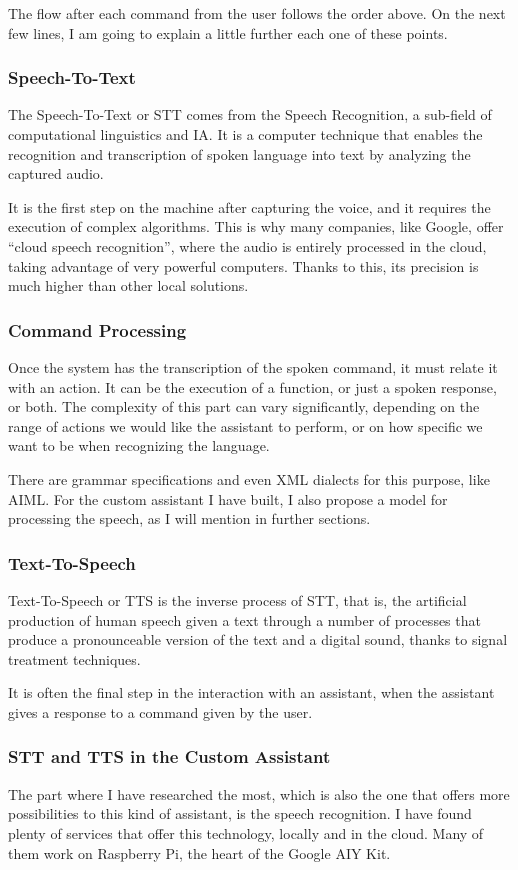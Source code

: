 The flow after each command from the user follows the order above. On the next few lines, I am going to explain a little further 
each one of these points.

\subsubsection{Speech-To-Text}
The Speech-To-Text or STT comes from the Speech Recognition, a sub-field of computational linguistics and IA. It is a computer 
technique that enables the recognition and transcription of spoken language into text by analyzing the captured audio.

It is the first step on the machine after capturing the voice, and it requires the execution of complex algorithms. This is why many 
companies, like Google, offer “cloud speech recognition”, where the audio is entirely processed in the cloud, taking advantage of 
very powerful computers. Thanks to this, its precision is much higher than other local solutions.

\subsubsection{Command Processing}
Once the system has the transcription of the spoken command, it must relate it with an action. It can be the execution of a function, 
or just a spoken response, or both. The complexity of this part can vary significantly, depending on the range of actions we would 
like the assistant to perform, or on how specific we want to be when recognizing the language.

There are grammar specifications and even XML dialects for this purpose, like AIML. For the custom assistant I have built, I also 
propose a model for processing the speech, as I will mention in further sections.

\subsubsection{Text-To-Speech}
Text-To-Speech or TTS is the inverse process of STT, that is, the artificial production of human speech given a text through a 
number of processes that produce a pronounceable version of the text and a digital sound, thanks to signal treatment techniques.

It is often the final step in the interaction with an assistant, when the assistant gives a response to a command given by the user.

\subsubsection{STT and TTS in the Custom Assistant}
The part where I have researched the most, which is also the one that offers more possibilities to this kind of assistant, is the 
speech recognition. I have found plenty of services that offer this technology, locally and in the cloud. Many of them work on 
Raspberry Pi, the heart of the Google AIY Kit.

